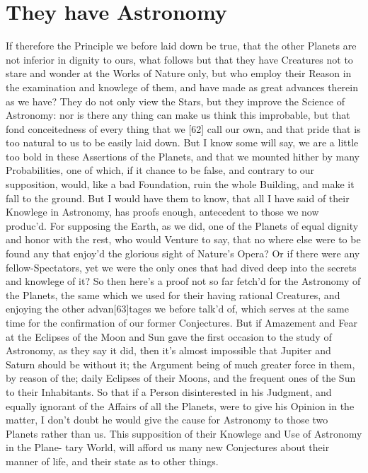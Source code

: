\documentclass[letterpaper]{book}
\begin{document}
\section{They have Astronomy}

If therefore the Principle we before laid down be true, that the other
Planets are not inferior in dignity to ours, what follows but that they have
Creatures not to stare and wonder at the Works of Nature only, but who
employ their Reason in the examination and knowlege of them, and have made
as great advances therein as we have? They do not only view the Stars, but
they improve the Science of Astronomy: nor is there any thing can make us
think this improbable, but that fond conceitedness of every thing that we
[62] call our own, and that pride that is too natural to us to be easily
laid down. But I know some will say, we are a little too bold in these
Assertions of the Planets, and that we mounted hither by many Probabilities,
one of which, if it chance to be false, and contrary to our supposition,
would, like a bad Foundation, ruin the whole Building, and make it fall to
the ground.  But I would have them to know, that all I have said of their
Knowlege in Astronomy, has proofs enough, antecedent to those we now
produc'd. For supposing the Earth, as we did, one of the Planets of equal
dignity and honor with the rest, who would Venture to say, that no where
else were to be found any that enjoy'd the glorious sight of Nature's Opera?
Or if there were any fellow-Spectators, yet we were the only ones that had
dived deep into the secrets and knowlege of it? So then here's a proof not
so far fetch'd for the Astronomy of the Planets, the same which we used for
their having rational Creatures, and enjoying the other advan[63]tages we
before talk'd of, which serves at the same time for the confirmation of our
former Conjectures. But if Amazement and Fear at the Eclipses of the Moon
and Sun gave the first occasion to the study of Astronomy, as they say it
did, then it's almost impossible that Jupiter and Saturn should be without
it; the Argument being of much greater force in them, by reason of the;
daily Eclipses of their Moons, and the frequent ones of the Sun to their
Inhabitants. So that if a Person disinterested in his Judgment, and equally
ignorant of the Affairs of all the Planets, were to give his Opinion in the
matter, I don't doubt he would give the cause for Astronomy to those two
Planets rather than us.  This supposition of their Knowlege and Use of
Astronomy in the Plane- tary World, will afford us many new Conjectures
about their manner of life, and their state as to other things.
\end{document}
